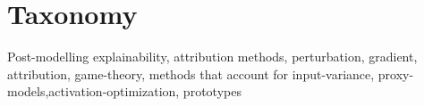 \section{Taxonomy}
Post-modelling explainability, attribution methods, perturbation, gradient, attribution, game-theory, methods that account for input-variance, proxy-models,activation-optimization, prototypes
